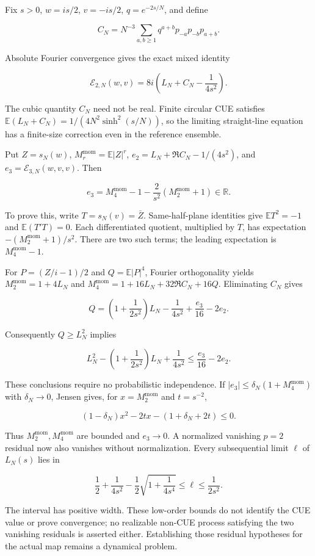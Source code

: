 Fix \(s>0\), \(w=is/2\), \(v=-is/2\), \(q=e^{-2s/N}\), and define

\[
C_N=N^{-3}\sum_{a,b\ge1}q^{a+b}p_{-a}p_{-b}p_{a+b}.
\]

Absolute Fourier convergence gives the exact mixed identity

\[
\mathcal E_{2,N}(w,v)=8i\left(L_N+C_N-\frac1{4s^2}\right).
\]

The cubic quantity \(C_N\) need not be real. Finite circular CUE satisfies
\(\mathbb E(L_N+C_N)=1/(4N^2\sinh^2(s/N))\), so the limiting straight-line
equation has a finite-size correction even in the reference ensemble.

Put \(Z=s_N(w)\), \(M_r^{\mathrm{mom}}=\mathbb E|Z|^r\),
\(e_2=L_N+\Re C_N-1/(4s^2)\), and \(e_3=\mathcal E_{3,N}(w,v,v)\).
Then

\[
e_3=M_4^{\mathrm{mom}}-1-\frac2{s^2}(M_2^{\mathrm{mom}}+1)\in\mathbb R.
\]

To prove this, write \(T=s_N(v)=\bar Z\). Same-half-plane identities give
\(\mathbb ET^2=-1\) and \(\mathbb E(T'T)=0\). Each differentiated quotient,
multiplied by \(T\), has expectation \(-(M_2^{\mathrm{mom}}+1)/s^2\). There are two such
terms; the leading expectation is \(M_4^{\mathrm{mom}}-1\).

For \(P=(Z/i-1)/2\) and \(Q=\mathbb E|P|^4\), Fourier orthogonality yields
\(M_2^{\mathrm{mom}}=1+4L_N\) and \(M_4^{\mathrm{mom}}=1+16L_N+32\Re C_N+16Q\). Eliminating \(C_N\) gives

\[
Q=\left(1+\frac1{2s^2}\right)L_N-\frac1{4s^2}
       +\frac{e_3}{16}-2e_2.
\]

Consequently \(Q\ge L_N^2\) implies

\[
L_N^2-\left(1+\frac1{2s^2}\right)L_N+\frac1{4s^2}
 \le\frac{e_3}{16}-2e_2.
\]

These conclusions require no probabilistic independence. If
\(|e_3|\le\delta_N(1+M_4^{\mathrm{mom}})\) with \(\delta_N\to0\), Jensen gives, for
\(x=M_2^{\mathrm{mom}}\) and \(t=s^{-2}\),

\[
(1-\delta_N)x^2-2tx-(1+\delta_N+2t)\le0.
\]

Thus \(M_2^{\mathrm{mom}},M_4^{\mathrm{mom}}\) are bounded and \(e_3\to0\). A normalized vanishing \(p=2\)
residual now also vanishes without normalization. Every subsequential
limit \(\ell\) of \(L_N(s)\) lies in

\[
\frac12+\frac1{4s^2}-\frac12\sqrt{1+\frac1{4s^4}}
 \le\ell\le\frac1{2s^2}.
\]

The interval has positive width. These low-order bounds do not identify
the CUE value or prove convergence; no realizable non-CUE process satisfying
the two vanishing residuals is asserted either. Establishing those residual
hypotheses for the actual map remains a dynamical problem.


